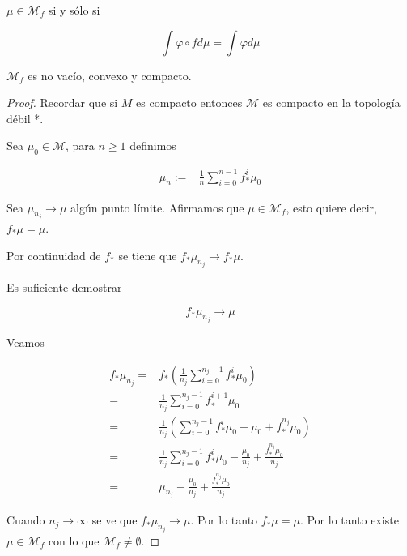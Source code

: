 \begin{lema}\label{lema3_krylov}
	$\mu \in \mathcal{M}_f$ si y sólo si
	
	\begin{equation}
		\int \varphi \circ f d\mu = \int \varphi d\mu
	\end{equation}
\end{lema}

\begin{teorema}
	$\mathcal{M}_f$ es no vacío, convexo y compacto.
\end{teorema}

\begin{proof}
	Recordar que si $M$ es compacto entonces $\mathcal{M}$ es compacto en la topología débil *.
	
	Sea $\mu_0 \in \mathcal{M}$, para $n \geq 1$ definimos
	
	\begin{align}
		\mu_n :=& \frac{1}{n} \sum_{i=0}^{n-1} f_*^i \mu_0
	\end{align}
	
		Sea $\mu_{n_j} \rightarrow \mu$ algún punto límite. Afirmamos que $\mu \in \mathcal{M}_f$, esto quiere decir, $f_*\mu = \mu$.
	
	Por continuidad de $f_*$ se tiene que $f_*\mu_{n_j} \rightarrow f_*\mu$.
	
	Es suficiente demostrar
	
	\begin{equation}
	f_*\mu_{n_j} \rightarrow \mu
	\end{equation}
	
	Veamos
	
	\begin{align}
	f_*\mu_{n_j} =& f_* \left( \frac{1}{n_j} \sum_{i=0}^{n_j-1} f^i_* \mu_0 \right)\\
	=& \frac{1}{n_j} \sum_{i=0}^{n_j-1} f_*^{i+1} \mu_0\\
	=& \frac{1}{n_j} \left( \sum_{i=0}^{n_j-1} f^i_* \mu_0 - \mu_0 + f^{n_j}_* \mu_0 \right)\\
	=& \frac{1}{n_j} \sum_{i=0}^{n_j-1} f^i_* \mu_0 - \frac{\mu_0}{n_j} + \frac{f^{n_j}_* \mu_0}{n_j}\\
	=& \mu_{n_j} - \frac{\mu_0}{n_j} + \frac{f^{n_j}_* \mu_0}{n_j}
	\end{align}
	
	Cuando $n_j \rightarrow \infty$ se ve que $f_* \mu_{n_j} \rightarrow \mu$. Por lo tanto $f_*\mu=\mu$. Por lo tanto existe $\mu \in \mathcal{M}_f$ con lo que $\mathcal{M}_f \neq \emptyset$.
	

\end{proof}
